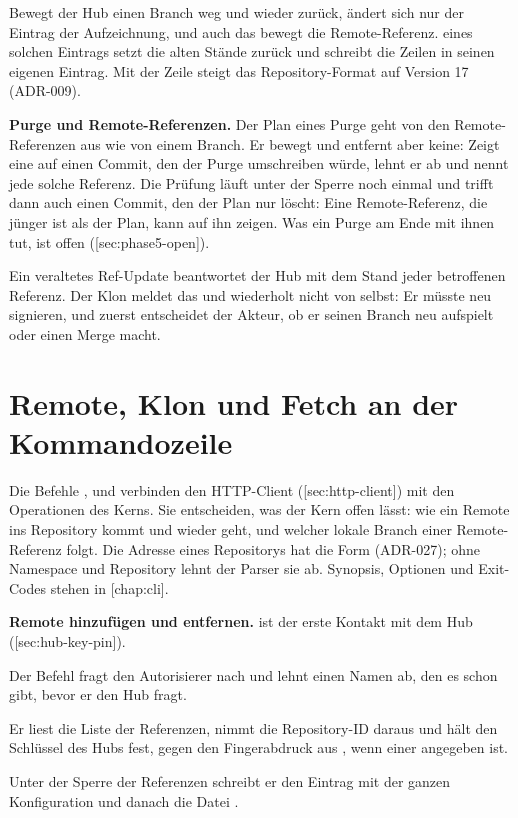 Bewegt der Hub einen Branch weg und wieder zurück, ändert sich nur der Eintrag der Aufzeichnung,
und auch das bewegt die Remote-Referenz.
 eines solchen Eintrags setzt die alten Stände zurück und schreibt die Zeilen
in seinen eigenen Eintrag.
Mit der Zeile  steigt das Repository-Format auf Version 17 (ADR-009).

\startinfobox
{\bf Purge und Remote-Referenzen.}
Der Plan eines Purge geht von den Remote-Referenzen aus wie von einem Branch.
Er bewegt und entfernt aber keine: Zeigt eine auf einen Commit, den der Purge umschreiben würde,
lehnt er ab und nennt jede solche Referenz.
Die Prüfung läuft unter der Sperre noch einmal und trifft dann auch einen Commit, den der Plan
nur löscht: Eine Remote-Referenz, die jünger ist als der Plan, kann auf ihn zeigen.
Was ein Purge am Ende mit ihnen tut, ist offen ([sec:phase5-open]).
\stopinfobox

Ein veraltetes Ref-Update beantwortet der Hub mit dem Stand jeder betroffenen Referenz.
Der Klon meldet das und wiederholt nicht von selbst: Er müsste neu signieren, und zuerst
entscheidet der Akteur, ob er seinen Branch neu aufspielt oder einen Merge macht.

\section[sec:network-commands]{Remote, Klon und Fetch an der Kommandozeile}

Die Befehle ,  und  verbinden den HTTP-Client
([sec:http-client]) mit den Operationen des Kerns.
Sie entscheiden, was der Kern offen lässt: wie ein Remote ins Repository kommt und wieder geht,
und welcher lokale Branch einer Remote-Referenz folgt.
Die Adresse eines Repositorys hat die Form 
(ADR-027); ohne Namespace und Repository lehnt der Parser sie ab.
Synopsis, Optionen und Exit-Codes stehen in [chap:cli].

{\bf Remote hinzufügen und entfernen.}
 ist der erste Kontakt mit dem Hub ([sec:hub-key-pin]).

\startitemize[n]
\item Der Befehl fragt den Autorisierer nach  und lehnt einen Namen ab, den es
schon gibt, bevor er den Hub fragt.
\item Er liest die Liste der Referenzen, nimmt die Repository-ID daraus und hält den Schlüssel
des Hubs fest, gegen den Fingerabdruck aus , wenn einer angegeben ist.
\item Unter der Sperre der Referenzen schreibt er den Eintrag  mit der ganzen
Konfiguration und danach die Datei .
\stopitemize

